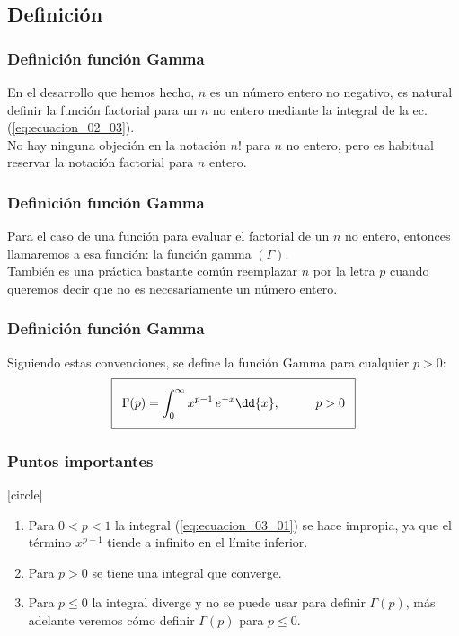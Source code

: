 \subsection{Definición}
\begin{frame}
\frametitle{Definición función Gamma}
En el desarrollo que hemos hecho, $n$ es un número entero no negativo, es natural definir la función factorial para un $n$ no entero mediante la integral de la ec.(\ref{eq:ecuacion_02_03}).
\\
\bigskip
\pause
No hay ninguna objeción en la notación $n!$ para $n$ no entero, pero es habitual reservar la notación factorial para $n$ entero.
\end{frame}
\begin{frame}
\frametitle{Definición función Gamma}
Para el caso de una función para evaluar el factorial de un $n$ no entero, entonces llamaremos a esa función: la función gamma $(\Gamma)$.
\\
\bigskip
\pause
También es una práctica bastante común reemplazar $n$ por la letra $p$ cuando queremos decir que no es necesariamente un número entero.
\end{frame}
\begin{frame}
\frametitle{Definición función Gamma}
Siguiendo estas convenciones, se define la función Gamma para cualquier $p > 0$:
\begin{align}\addtolength{\fboxsep}{5pt}\boxed{
\Gamma (p) = \int_{0}^{\infty} x^{p-1} \, e^{-x} \dd{x}, \hspace{1cm} p > 0}
\label{eq:ecuacion_03_01}
\end{align}
\end{frame}
\begin{frame}
\frametitle{Puntos importantes}
[circle]
\begin{enumerate}[<+->]
\item Para $0 < p < 1$ la integral (\ref{eq:ecuacion_03_01}) se hace impropia, ya que el término $x^{p-1}$ tiende a infinito en el límite inferior.
\item Para $p > 0$ se tiene una integral que converge.
\item Para $p \leq 0$ la integral diverge y no se puede usar para definir $\Gamma (p)$, más adelante veremos cómo definir  $\Gamma (p)$ para $p \leq 0$.
\end{enumerate}
\end{frame}
